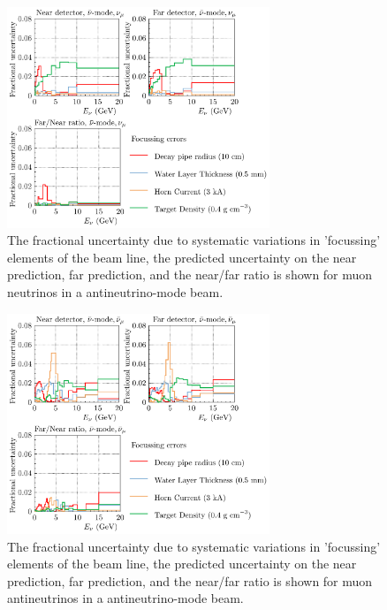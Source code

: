 \documentclass{article}
\begin{document}
\begin{figure}
  \centering
  \includegraphics[width=0.7\textwidth]{plots/fracerrs/nubarmode_numu_Focussing}
  \caption{The fractional uncertainty due to systematic variations in 'focussing' elements of the beam line, the predicted uncertainty on the near prediction, far prediction, and the near/far ratio is shown for muon neutrinos in a antineutrino-mode beam.}
  \label{fig:foc_nubar_numu}
\end{figure}

\begin{figure}
  \centering
  \includegraphics[width=0.7\textwidth]{plots/fracerrs/nubarmode_numubar_Focussing}
  \caption{The fractional uncertainty due to systematic variations in 'focussing' elements of the beam line, the predicted uncertainty on the near prediction, far prediction, and the near/far ratio is shown for muon antineutrinos in a antineutrino-mode beam.}
  \label{fig:foc_nubar_numubar}
\end{figure}
\end{document}
